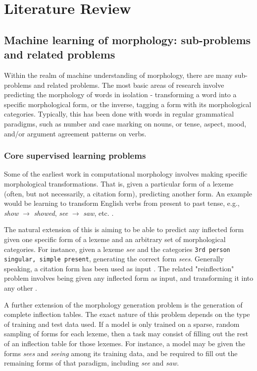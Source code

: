 \chapter{Literature Review}

\section{Machine learning of morphology: sub-problems and related problems}

Within the realm of machine understanding of morphology, there are many sub-problems and related problems. The most basic areas of research involve predicting the morphology of words in isolation - transforming a word into a specific morphological form, or the inverse, tagging a form with its morphological categories. Typically, this has been done with words in regular grammatical paradigms, such as number and case marking on nouns, or tense, aspect, mood, and/or argument agreement patterns on verbs. 

\subsection{Core supervised learning problems}

Some of the earliest work in computational morphology involves making specific morphological transformations. That is, given a particular form of a lexeme (often, but not necessarily, a citation form), predicting another form. An example would be learning to transform English verbs from present to past tense, e.g., \textit{show} $\rightarrow$ \textit{showed}, \textit{see} $\rightarrow$ \textit{saw}, etc. \parencite{Dreyer2008}.

The natural extension of this is aiming to be able to predict any inflected form given one specific form of a lexeme and an arbitrary set of morphological categories. For instance, given a lexeme \textit{see} and the categories \texttt{3rd person singular, simple present}, generating the correct form \textit{sees}. Generally speaking, a citation form has been used as input \parencite{Durrett2013} \parencite{Faruqui2015} \parencite{Cotterell2017}. The related "reinflection" problem involves being given any inflected form as input, and transforming it into any other \parencite{Cotterell2016}.

A further extension of the morphology generation problem is the generation of complete inflection tables. The exact nature of this problem depends on the type of training and test data used. If a model is only trained on a sparse, random sampling of forms for each lexeme, then a task may consist of filling out the rest of an inflection table for those lexemes. For instance, a model may be given the forms \textit{sees} and \textit{seeing} among its training data, and be required to fill out the remaining forms of that paradigm, including \textit{see} and \textit{saw}. 


